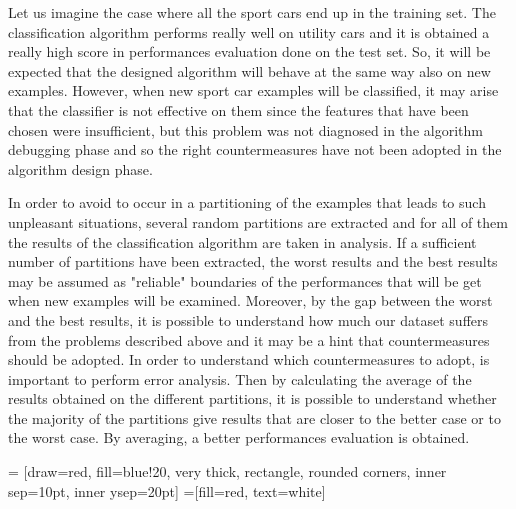 \documentclass[aps,letterpaper,10pt]{revtex4}
\begin{document}
Let us imagine the case where all the sport cars end up in the training set. The classification algorithm performs really well on utility cars and it is obtained a really high score in performances evaluation done on the test set. So, it will be expected that the designed algorithm will behave at the same way also on new examples. However, when new sport car examples will be classified, it may arise that the classifier is not effective on them since the features that have been chosen were insufficient, but this problem was not diagnosed in the algorithm debugging phase and so the right countermeasures have not been adopted in the algorithm design phase. 

In order to avoid to occur in a partitioning of the examples that leads to such unpleasant situations, several random partitions are extracted and for all of them the results of the classification algorithm are taken in analysis. If a sufficient number of partitions have been extracted, the worst results and the best results may be assumed as "reliable" boundaries of the performances that will be get when new examples will be examined. Moreover, by the gap between the worst and the best results, it is possible to understand how much our dataset suffers from the problems described above and it may be a hint that countermeasures should be adopted. In order to understand which countermeasures to adopt, is important to perform error analysis. Then by calculating the average of the results obtained on the different partitions, it is possible to understand whether the majority of the partitions give results that are closer to the better case or to the worst case. By averaging, a better performances evaluation is obtained.

 = [draw=red, fill=blue!20, very thick,
    rectangle, rounded corners, inner sep=10pt, inner ysep=20pt]
 =[fill=red, text=white]

%
\end{document}
